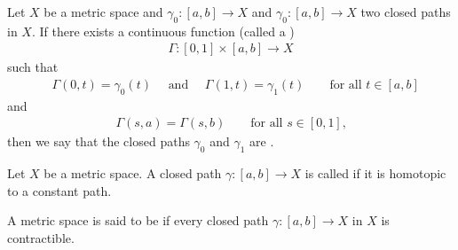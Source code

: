 \begin{definition}
  \label{def:path_homotopy}
  Let $X$ be a metric space and
  $\gamma_0 \colon [a,b] \to X$ and $\gamma_0 \colon [a,b] \to X$
  two closed paths in $X$.
  If there exists a
  continuous function (called a )
  \begin{align*}
    \Gamma \colon [0,1] \times [a,b] \to X
  \end{align*}
  such that
  \begin{align*}
    & \Gamma(0,t) = \gamma_0(t)
      \quad \text{ and } \quad
      \Gamma(1,t) = \gamma_1(t)
      \qquad \text{for all $t \in [a,b]$} %
  \end{align*}
  and
  \begin{align*}
    \Gamma(s,a) = \Gamma(s,b) \qquad \text{for all $s \in [0,1]$,}
  \end{align*}
  then we say that the closed paths $\gamma_0$ and $\gamma_1$
  are .
\end{definition}

\begin{definition}
  \label{def:contractible}
  Let $X$ be a metric space.
  A closed path $\gamma \colon [a,b] \to X$ is called
   if it is homotopic to a constant path.
\end{definition}

\begin{definition}
  \label{def:simply_connected}
  A metric space is said to be 
  if every closed path $\gamma \colon [a,b] \to X$ in $X$
  is contractible.
\end{definition}
